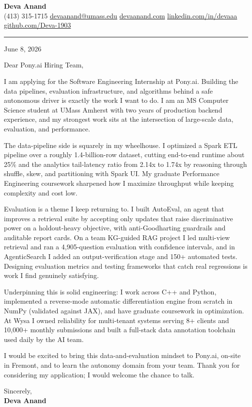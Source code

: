 \documentclass[letterpaper,11pt]{article}
\begin{document}
\pagestyle{empty}

\begin{center}
  {\LARGE \bfseries \textcolor{ResumeNavy}{Deva Anand}} \\ \vspace{3pt}
  \small
  (413) 315-1715 \enspace\textbar\enspace
  \href{mailto:devaanand@umass.edu}{devaanand@umass.edu} \enspace\textbar\enspace
  \href{https://devaanand.com}{devaanand.com} \enspace\textbar\enspace
  \href{https://linkedin.com/in/devaaa/}{linkedin.com/in/devaaa} \enspace\textbar\enspace
  \href{https://github.com/Deva-1903}{github.com/Deva-1903}
\end{center}
\vspace{4pt}
{\color{ResumeNavy}\hrule}
\vspace{10pt}

\textcolor{ResumeSlate}{June 8, 2026}

Dear Pony.ai Hiring Team,

I am applying for the Software Engineering Internship at Pony.ai. Building the data pipelines, evaluation infrastructure, and algorithms behind a safe autonomous driver is exactly the work I want to do. I am an MS Computer Science student at UMass Amherst with two years of production backend experience, and my strongest work sits at the intersection of large-scale data, evaluation, and performance.

The data-pipeline side is squarely in my wheelhouse. I optimized a Spark ETL pipeline over a roughly 1.4-billion-row dataset, cutting end-to-end runtime about 25\% and the analytics tail-latency ratio from 2.14x to 1.74x by reasoning through shuffle, skew, and partitioning with Spark UI. My graduate Performance Engineering coursework sharpened how I maximize throughput while keeping complexity and cost low.

Evaluation is a theme I keep returning to. I built AutoEval, an agent that improves a retrieval suite by accepting only updates that raise discriminative power on a holdout-heavy objective, with anti-Goodharting guardrails and auditable report cards. On a team KG-guided RAG project I led multi-view retrieval and ran a 4,905-question evaluation with confidence intervals, and in AgenticSearch I added an output-verification stage and 150+ automated tests. Designing evaluation metrics and testing frameworks that catch real regressions is work I find genuinely satisfying.

Underpinning this is solid engineering: I work across C++ and Python, implemented a reverse-mode automatic differentiation engine from scratch in NumPy (validated against JAX), and have graduate coursework in optimization. At Wysa I owned reliability for multi-tenant systems serving 8+ clients and 10,000+ monthly submissions and built a full-stack data annotation toolchain used daily by the AI team.

I would be excited to bring this data-and-evaluation mindset to Pony.ai, on-site in Fremont, and to learn the autonomy domain from your team. Thank you for considering my application; I would welcome the chance to talk.

\vspace{6pt}
Sincerely, \\
\textbf{Deva Anand}
\end{document}
